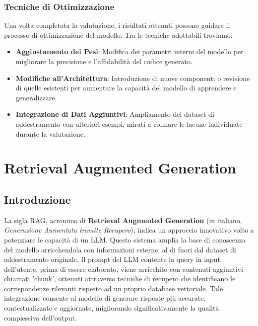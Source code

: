 \documentclass[12pt,a4paper,openright,twoside]{book}
\begin{document}
\subsection{Tecniche di Ottimizzazione}
Una volta completata la valutazione, i risultati ottenuti possono guidare il processo di ottimizzazione del modello. Tra le tecniche adottabili troviamo:
\begin{itemize}
    \item \textbf{Aggiustamento dei Pesi}: Modifica dei parametri interni del modello per migliorare la precisione e l'affidabilità del codice generato.
    \item \textbf{Modifiche all'Architettura}: Introduzione di nuove componenti o revisione di quelle esistenti per aumentare la capacità del modello di apprendere e generalizzare.
    \item \textbf{Integrazione di Dati Aggiuntivi}: Ampliamento del dataset di addestramento con ulteriori esempi, mirati a colmare le lacune individuate durante la valutazione.
\end{itemize}
\chapter{Retrieval Augmented Generation}
\section{Introduzione} 
La sigla RAG, acronimo di \textbf{Retrieval Augmented Generation} (in italiano, \textit{Generazione Aumentata tramite Recupero}), indica un approccio innovativo volto a potenziare le capacità di un \ac{LLM}.
Questo sistema amplia la base di conoscenza del modello arricchendola con informazioni esterne, al di fuori dal dataset di addestramento originale.
Il prompt del \ac{LLM} contente la query in input dell'utente, prima di essere elaborato, viene arricchito con contenuti aggiuntivi chiamati 'chunk', ottenuti attraverso tecniche di recupero che identificano le corrispondenze rilevanti rispetto ad un proprio database vettoriale.
Tale integrazione consente al modello di generare risposte più accurate, contestualizzate e aggiornate, migliorando significativamente la qualità complessiva dell’output.
\end{document}
